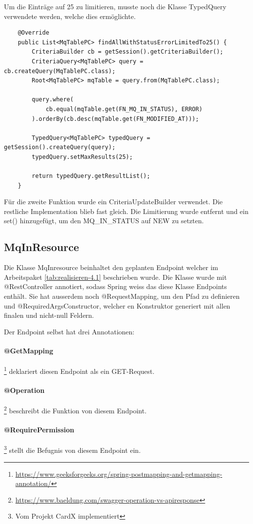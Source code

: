 Um die Einträge auf 25 zu limitieren, musste noch die Klasse TypedQuery verwendete werden, welche dies ermöglichte.

\begin{verbatim}
	@Override
	public List<MqTablePC> findAllWithStatusErrorLimitedTo25() {
		CriteriaBuilder cb = getSession().getCriteriaBuilder();
		CriteriaQuery<MqTablePC> query = cb.createQuery(MqTablePC.class);
		Root<MqTablePC> mqTable = query.from(MqTablePC.class);
		
		query.where(
			cb.equal(mqTable.get(FN_MQ_IN_STATUS), ERROR)
		).orderBy(cb.desc(mqTable.get(FN_MODIFIED_AT)));
		
		TypedQuery<MqTablePC> typedQuery = getSession().createQuery(query);
		typedQuery.setMaxResults(25);
		
		return typedQuery.getResultList();
	}
\end{verbatim}

\noindent Für die zweite Funktion wurde ein CriteriaUpdateBuilder verwendet. Die restliche Implementation blieb fast gleich. Die Limitierung wurde entfernt und ein set() hinzugefügt, um den MQ\_IN\_STATUS auf NEW zu setzten.

\subsection{MqInResource}
Die Klasse MqInresource beinhaltet den geplanten Endpoint welcher im Arbeitspaket \ref{tab:realisieren-4.1} beschrieben wurde. Die Klasse wurde mit @RestController annotiert, sodass Spring weiss das diese Klasse Endpoints enthält. Sie hat ausserdem noch @RequestMapping, um den Pfad zu definieren und @RequiredArgsConstructor, welcher en Konstruktor generiert mit allen finalen und nicht-null Feldern.

Der Endpoint selbst hat drei Annotationen:

\paragraph{@GetMapping} \footnote{\url{https://www.geeksforgeeks.org/spring-postmapping-and-getmapping-annotation/}} deklariert diesen Endpoint als ein GET-Request.
\paragraph{@Operation} \footnote{\url{https://www.baeldung.com/swagger-operation-vs-apiresponse}} beschreibt die Funktion von diesem Endpoint.
\paragraph{@RequirePermission} \footnote{Vom Projekt CardX implementiert} stellt die Befugnis von diesem Endpoint ein. \newline

